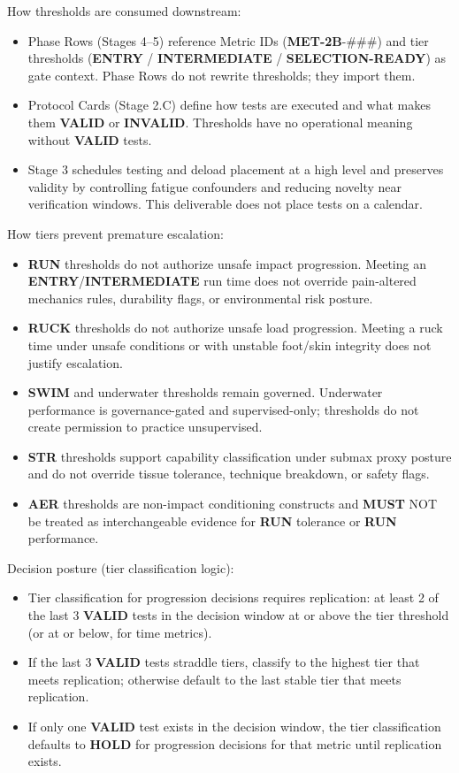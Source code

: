 \documentclass[10pt]{article}
\begin{document}
How thresholds are consumed downstream:

\begin{itemize}
\item Phase Rows (Stages 4–5) reference Metric IDs (\textbf{MET-2B}-\#\#\#) and tier thresholds (\textbf{ENTRY} / \textbf{INTERMEDIATE} / \textbf{SELECTION-READY}) as gate context. Phase Rows do not rewrite thresholds; they import them.
\item Protocol Cards (Stage 2.C) define how tests are executed and what makes them \textbf{VALID} or \textbf{INVALID}. Thresholds have no operational meaning without \textbf{VALID} tests.
\item Stage 3 schedules testing and deload placement at a high level and preserves validity by controlling fatigue confounders and reducing novelty near verification windows. This deliverable does not place tests on a calendar.
\end{itemize}

How tiers prevent premature escalation:

\begin{itemize}
\item \textbf{RUN} thresholds do not authorize unsafe impact progression. Meeting an \textbf{ENTRY}/\textbf{INTERMEDIATE} run time does not override pain-altered mechanics rules, durability flags, or environmental risk posture.
\item \textbf{RUCK} thresholds do not authorize unsafe load progression. Meeting a ruck time under unsafe conditions or with unstable foot/skin integrity does not justify escalation.
\item \textbf{SWIM} and underwater thresholds remain governed. Underwater performance is governance-gated and supervised-only; thresholds do not create permission to practice unsupervised.
\item \textbf{STR} thresholds support capability classification under submax proxy posture and do not override tissue tolerance, technique breakdown, or safety flags.
\item \textbf{AER} thresholds are non-impact conditioning constructs and \textbf{MUST} NOT be treated as interchangeable evidence for \textbf{RUN} tolerance or \textbf{RUN} performance.
\end{itemize}

Decision posture (tier classification logic):

\begin{itemize}
\item Tier classification for progression decisions requires replication: at least 2 of the last 3 \textbf{VALID} tests in the decision window at or above the tier threshold (or at or below, for time metrics).
\item If the last 3 \textbf{VALID} tests straddle tiers, classify to the highest tier that meets replication; otherwise default to the last stable tier that meets replication.
\item If only one \textbf{VALID} test exists in the decision window, the tier classification defaults to \textbf{HOLD} for progression decisions for that metric until replication exists.
\end{itemize}
\end{document}
